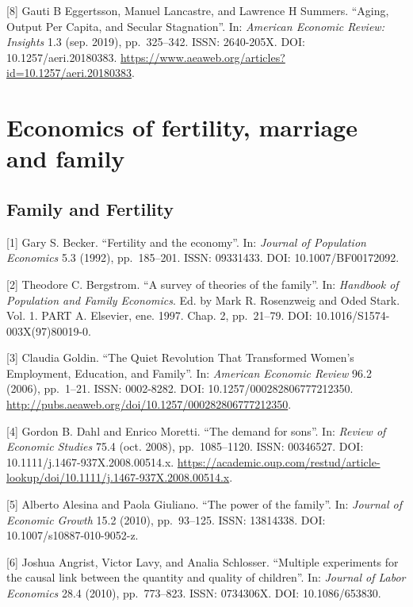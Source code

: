 \documentclass[
  12pt,
]{article}
\begin{document}
{[}8{]} Gauti B Eggertsson, Manuel Lancastre, and Lawrence H Summers.
``Aging, Output Per Capita, and Secular Stagnation''. In:
\emph{American Economic Review: Insights} 1.3 (sep. 2019), pp.~325--342.
ISSN: 2640-205X. DOI: 10.1257/aeri.20180383.
\url{https://www.aeaweb.org/articles?id=10.1257/aeri.20180383}.

\hypertarget{economics-of-fertility-marriage-and-family}{%
\section{\texorpdfstring{\textbf{Economics of fertility, marriage and
family}}{Economics of fertility, marriage and family}}\label{economics-of-fertility-marriage-and-family}}

\hypertarget{family-and-fertility}{%
\subsection{Family and Fertility}\label{family-and-fertility}}

{[}1{]} Gary S. Becker. ``Fertility and the economy''. In:
\emph{Journal of Population Economics} 5.3 (1992), pp.~185--201. ISSN:
09331433. DOI: 10.1007/BF00172092.

{[}2{]} Theodore C. Bergstrom. ``A survey of theories of the family''.
In: \emph{Handbook of Population and Family Economics}. Ed. by Mark R.
Rosenzweig and Oded Stark. Vol. 1. PART A. Elsevier, ene. 1997. Chap. 2,
pp.~21--79. DOI: 10.1016/S1574-003X(97)80019-0.

{[}3{]} Claudia Goldin. ``The Quiet Revolution That Transformed Women's
Employment, Education, and Family''. In: \emph{American Economic Review}
96.2 (2006), pp.~1--21. ISSN: 0002-8282. DOI:
10.1257/000282806777212350.
\url{http://pubs.aeaweb.org/doi/10.1257/000282806777212350}.

{[}4{]} Gordon B. Dahl and Enrico Moretti. ``The demand for sons''. In:
\emph{Review of Economic Studies} 75.4 (oct. 2008), pp.~1085--1120.
ISSN: 00346527. DOI: 10.1111/j.1467-937X.2008.00514.x.
\url{https://academic.oup.com/restud/article-lookup/doi/10.1111/j.1467-937X.2008.00514.x}.

{[}5{]} Alberto Alesina and Paola Giuliano. ``The power of the family''.
In: \emph{Journal of Economic Growth} 15.2 (2010), pp.~93--125. ISSN:
13814338. DOI: 10.1007/s10887-010-9052-z.

{[}6{]} Joshua Angrist, Victor Lavy, and Analia Schlosser. ``Multiple
experiments for the causal link between the quantity and quality of
children''. In: \emph{Journal of Labor Economics} 28.4 (2010),
pp.~773--823. ISSN: 0734306X. DOI: 10.1086/653830.
\end{document}
